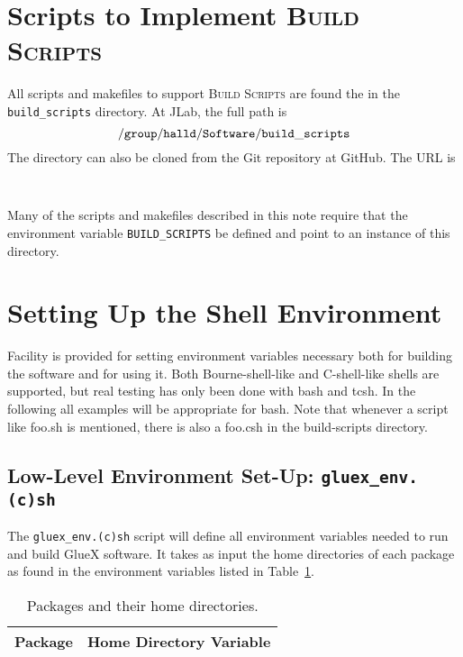 \documentclass[12pt, letterpaper]{article}
\newcommand{\bs}{\textsc{Build Scripts}}
\begin{document}
\section{Scripts to Implement \bs{}}

All scripts and makefiles to support \bs{} are found the in the {\tt
  build\_scripts} directory. At JLab, the full path is
$${\tt /group/halld/Software/build\_scripts}$$
The directory can also be cloned from the Git repository at GitHub. The URL is
\begin{center}\tt 
\end{center}
Many of the scripts and makefiles described in this note require that
the environment variable {\tt BUILD\_SCRIPTS} be defined and point to
an instance of this directory.

\section{Setting Up the Shell Environment}

Facility is provided for setting environment variables necessary both
for building the software and for using it. Both Bourne-shell-like and
C-shell-like shells are supported, but real testing has only been done
with bash and tcsh. In the following all examples will be appropriate
for bash. Note that whenever a script like foo.sh is mentioned, there
is also a foo.csh in the build-scripts directory.

\subsection{Low-Level Environment Set-Up: {\tt gluex\_env.(c)sh}}
\label{section:low-level-environment-setting}

The {\tt gluex\_env.(c)sh} script will define all environment
variables needed to run and build GlueX software. It takes as input
the home directories of each package as found in the environment
variables listed in Table~\ref{table:home-directories}.

\begin{table}
\begin{center}
\begin{tabular}{|l|l|}
\hline
\bf Package & \bf Home Directory Variable \\
\hline

\hline
\end{tabular}
\end{center}
\caption{Packages and their home directories.}\label{table:home-directories}
\end{table}
\end{document}
